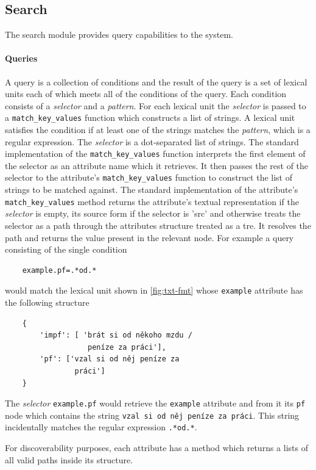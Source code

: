 \documentclass[10pt, a4paper, twocolumn]{article} %
\newcommand{\py}[1]{{\tt #1}}
\newcommand{\att}[1]{{\tt #1}}
\begin{document}
\subsection{Search}
The search module provides query capabilities to the system.

\paragraph{Queries} A query is a collection of conditions
and the result of the query is a set of lexical units each of which meets all
of the conditions of the query. Each condition consists of a \emph{selector} and a
\emph{pattern}. For each lexical unit the \emph{selector} is passed to a \py{match\_key\_values}
function which constructs a list of strings. A lexical unit satisfies the condition if at
least one of the strings matches the \emph{pattern}, which is a regular expression.
The \emph{selector} is a dot-separated list of strings. The standard implementation of the
\py{match\_key\_values} function interprets the first element of the selector as an attribute
name which it retrieves. It then passes the rest of the selector to the attribute's \py{match\_key\_values}
function to construct the list of strings to be matched against. The standard implementation
of the attribute's \py{match\_key\_values} method returns the attribute's textual representation
if the \emph{selector} is empty, its source form if the selector is 'src' and otherwise treats
the selector as a path through the attributes structure treated as a tre. It resolves the path and returns the
value present in the relevant node. For example a query consisting of the single condition
\begin{verbatim}
    example.pf=.*od.*
\end{verbatim}
would match the lexical unit shown in \autoref{fig:txt-fmt} whose \att{example} attribute
has the following structure
\begin{verbatim}
    {
        'impf': [ 'brát si od někoho mzdu /
                   peníze za práci'],
        'pf': ['vzal si od něj peníze za
                práci']
    }
\end{verbatim}
The \emph{selector} \att{example.pf} would retrieve the \att{example} attribute and from it
its \att{pf} node which contains the string {\tt vzal si od něj peníze za práci}. This string
incidentally matches the regular expression {\tt .*od.*}.

For discoverability purposes, each attribute has a method which returns a lists of all valid paths
inside its structure.
\end{document}
